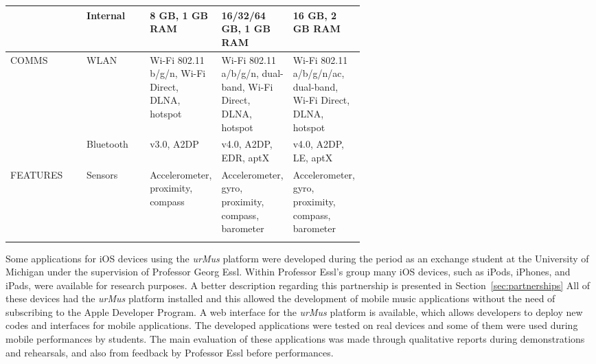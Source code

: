 \begin{longtable}{llp{0.2\linewidth}p{0.2\linewidth}p{0.2\linewidth}}
	& Internal      & 8 GB, 1 GB RAM                                  & 16/32/64 GB, 1 GB RAM                                                                       & 16 GB, 2 GB RAM                                                                                                \\ \hline
	COMMS    & WLAN          & Wi-Fi 802.11 b/g/n, Wi-Fi Direct, DLNA, hotspot & Wi-Fi 802.11 a/b/g/n, dual-band, Wi-Fi Direct, DLNA, hotspot                                & Wi-Fi 802.11 a/b/g/n/ac, dual-band, Wi-Fi Direct, DLNA, hotspot                                                \\
	& Bluetooth     & v3.0, A2DP                                      & v4.0, A2DP, EDR, aptX                                                                       & v4.0, A2DP, LE, aptX                                                                                           \\ \hline
	FEATURES & Sensors       & Accelerometer, proximity, compass               & Accelerometer, gyro, proximity, compass, barometer                                          & Accelerometer, gyro, proximity, compass, barometer                                                             \\ \hline
	\label{tab:gsmarena-lg-s3-z3-short}
\end{longtable}

Some applications for iOS devices using the \textit{\textit{urMus}} platform were developed during the period as an exchange student at the University of Michigan under the supervision of Professor Georg Essl.
Within Professor Essl's group many iOS devices, such as iPods, iPhones, and iPads, were available for research purposes.
A better description regarding this partnership is presented in Section~\ref{sec:partnerships}
All of these devices had the \textit{urMus} platform installed and this allowed the development of mobile music applications without the need of subscribing to the Apple Developer Program.
A web interface for the \textit{urMus} platform  is available, which allows developers to deploy new codes and interfaces for mobile applications.
The developed applications were tested on real devices and some of them were used during mobile performances by students.
The main evaluation of these applications was made through qualitative reports during demonstrations and rehearsals, and also from feedback by Professor Essl before performances.


